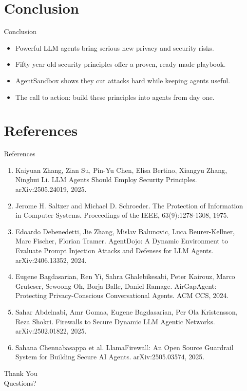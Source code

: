 \documentclass[10pt]{beamer}
\begin{document}
\section{Conclusion}
\begin{frame}{Conclusion}
\begin{itemize}
  \item Powerful LLM agents bring serious new privacy and security risks.
  \item Fifty-year-old security principles offer a proven, ready-made playbook.
  \item AgentSandbox shows they cut attacks hard while keeping agents useful.
  \item The call to action: build these principles into agents from day one.
\end{itemize}
\end{frame}
\section{References}
\begin{frame}[allowframebreaks]{References}
  \footnotesize
  \begin{enumerate}
    \item Kaiyuan Zhang, Zian Su, Pin-Yu Chen, Elisa Bertino, Xiangyu Zhang, Ninghui Li. LLM Agents Should Employ Security Principles. arXiv:2505.24019, 2025.
    \item Jerome H. Saltzer and Michael D. Schroeder. The Protection of Information in Computer Systems. Proceedings of the IEEE, 63(9):1278-1308, 1975.
    \item Edoardo Debenedetti, Jie Zhang, Mislav Balunovic, Luca Beurer-Kellner, Marc Fischer, Florian Tramer. AgentDojo: A Dynamic Environment to Evaluate Prompt Injection Attacks and Defenses for LLM Agents. arXiv:2406.13352, 2024.
    \item Eugene Bagdasarian, Ren Yi, Sahra Ghalebikesabi, Peter Kairouz, Marco Gruteser, Sewoong Oh, Borja Balle, Daniel Ramage. AirGapAgent: Protecting Privacy-Conscious Conversational Agents. ACM CCS, 2024.
    \item Sahar Abdelnabi, Amr Gomaa, Eugene Bagdasarian, Per Ola Kristensson, Reza Shokri. Firewalls to Secure Dynamic LLM Agentic Networks. arXiv:2502.01822, 2025.
    \item Sahana Chennabasappa et al. LlamaFirewall: An Open Source Guardrail System for Building Secure AI Agents. arXiv:2505.03574, 2025.
  \end{enumerate}
\end{frame}
\begin{frame}[plain]
  \begin{center}
    {\Huge Thank You}\\[1em]
    {\large Questions?}
  \end{center}
\end{frame}
\end{document}
